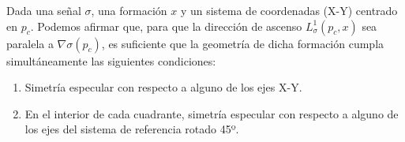 \begin{prop}
\label{prop: l_parallel}
Dada una señal $\sigma$, una formación $x$ y un sistema de coordenadas (X-Y) centrado en $p_c$. Podemos afirmar que, para que la dirección de ascenso $L_\sigma^1(p_c, x)$ sea paralela a $\nabla\sigma(p_c)$, es suficiente que la geometría de dicha formación cumpla simultáneamente las siguientes condiciones:

\begin{enumerate}
    \item Simetría especular con respecto a alguno de los ejes X-Y.
    \item En el interior de cada cuadrante, simetría especular con respecto a alguno de los ejes del sistema de referencia rotado 45º.
\end{enumerate}

\end{prop}

